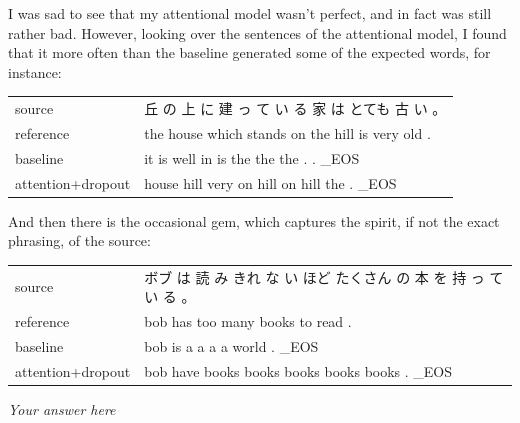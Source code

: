 \documentclass[answers]{exam}
\begin{document}
\begin{CJK}{UTF8}{min}
\begin{questions}
\begin{framed}
  I was sad to see that my attentional model wasn't perfect, and in fact was
  still rather bad. However, looking over the sentences of the attentional
  model, I found that it more often than the baseline generated some of the
  expected words, for instance:

  \begin{tabular}{ll}
    source            & 丘 の 上 に 建 っ て い る 家 は とても 古 い 。\\
    reference         & the house which stands on the hill is very old .\\
    baseline          & it is well in is the the the . . \_EOS\\
    attention+dropout & house hill very on hill on hill the . \_EOS
  \end{tabular}

  And then there is the occasional gem, which captures the spirit, if not the
  exact phrasing, of the source:

  \begin{tabular}{ll}
    source            & ボブ は 読 み きれ な い ほど たくさん の 本 を 持 っ て い る 。\\
    reference         & bob has too many books to read . \\
    baseline          & bob is a a a a world . \_EOS\\
    attention+dropout & bob have books books books books books . \_EOS
  \end{tabular}
\end{framed}

\begin{framed}
\emph{Your answer here}
\end{framed}
\end{questions}

\clearpage





\end{CJK}
\end{document}
